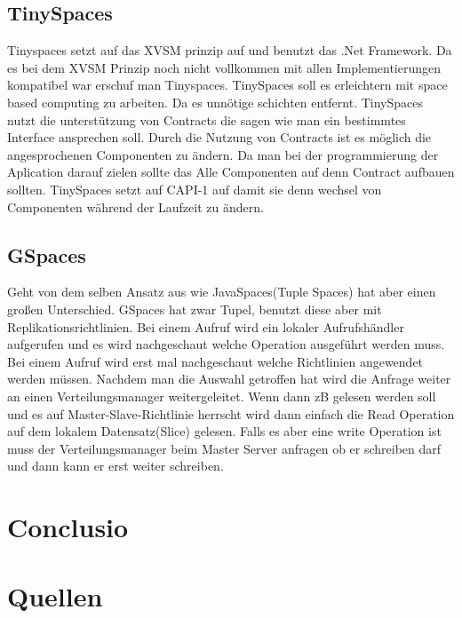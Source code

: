 \documentclass[a4paper,12pt]{scrreprt}
\begin{document}
		
		\section{TinySpaces}
			Tinyspaces setzt auf das XVSM prinzip auf und benutzt das .Net Framework. Da es bei dem XVSM Prinzip noch nicht vollkommen mit allen Implementierungen kompatibel war erschuf man Tinyspaces. 
			TinySpaces soll es erleichtern mit space based computing zu arbeiten. Da es unnötige schichten entfernt. 
			TinySpaces nutzt die unterstützung von Contracts die sagen wie man ein bestimmtes Interface ansprechen soll.
			Durch die Nutzung von Contracts ist es möglich die angesprochenen Componenten zu ändern. Da man bei der programmierung der Aplication darauf zielen sollte das Alle Componenten auf denn Contract aufbauen sollten.
			TinySpaces setzt auf CAPI-1 auf damit sie denn wechsel von Componenten während der Laufzeit zu ändern.
		\section{GSpaces}
		Geht von dem selben Ansatz aus wie JavaSpaces(Tuple Spaces) hat aber einen großen Unterschied. GSpaces hat zwar Tupel, benutzt diese aber mit Replikationsrichtlinien.  Bei einem Aufruf wird ein lokaler Aufrufshändler aufgerufen und es wird nachgeschaut welche Operation ausgeführt werden muss. Bei  einem Aufruf wird erst mal nachgeschaut welche Richtlinien angewendet werden müssen. Nachdem man die Auswahl getroffen hat wird die Anfrage weiter an einen Verteilungsmanager weitergeleitet.  Wenn dann zB gelesen werden soll und es auf Master-Slave-Richtlinie herrscht wird dann einfach die Read Operation auf dem lokalem Datensatz(Slice) gelesen. Falls es aber eine write Operation ist muss der Verteilungsmanager beim Master Server anfragen ob er schreiben darf und dann kann er erst weiter schreiben.	
	
\chapter{Conclusio}

\chapter{Quellen}
\end{document}
